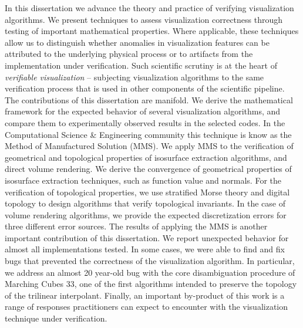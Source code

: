 
In this dissertation we advance the theory and practice of verifying visualization algorithms.
%
We present techniques to assess visualization correctness  through testing of important mathematical properties. Where applicable, these techniques allow us to distinguish
 whether anomalies in visualization features can be attributed to the
  underlying physical process or to artifacts from the implementation under verification.
Such scientific scrutiny is at the heart of {\em
    verifiable visualization} -- subjecting visualization algorithms
  to the same verification process that is used in other components of
  the scientific pipeline.  The contributions of this dissertation are manifold. We derive the mathematical framework for
  the expected behavior of several 
  visualization algorithms,
  and compare them to experimentally observed results in the selected
  codes.  In the Computational Science \& Engineering community \cse{} this technique is know as the Method of Manufactured Solution (MMS). We apply MMS to the verification of geometrical and topological properties of isosurface extraction algorithms, and direct volume rendering. 
We derive the convergence of geometrical properties of isosurface extraction techniques, such as function value and normals. For the verification of topological properties, we use stratified Morse theory and digital topology to
design algorithms that verify topological invariants. In the case of volume rendering algorithms, we provide the expected discretization errors for three different error sources.
The results of applying the MMS is another important contribution of this dissertation. 
%
We report unexpected behavior for almost all implementations tested. In some cases, we were able to find and fix bugs that prevented the correctness of the visualization algorithm. 
%
In particular,  we address an almost 20 year-old bug with the core disambiguation procedure of  Marching Cubes 33, one of the first algorithms intended to preserve the topology of the trilinear interpolant. 
%
Finally,  an important by-product of this work is a range of responses practitioners can expect to encounter with the visualization technique under verification. 
  